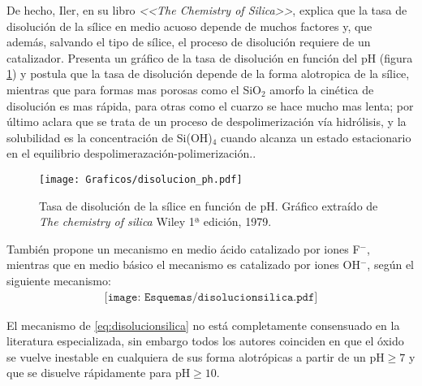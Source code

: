 	De hecho, Iler, en su libro \textit{<<The Chemistry of Silica>>}, explica que la tasa de disolución de la sílice en medio acuoso depende de muchos factores y, que además, salvando el tipo de sílice, el proceso de disolución requiere de un catalizador. Presenta un gráfico de la tasa de disolución en función del pH (figura \ref{fig:disolucion_ph}) y postula que la tasa de disolución depende de la forma alotropica de la sílice, mientras que para formas mas porosas como el SiO$_2$ amorfo la cinética de disolución es mas rápida, para otras como el cuarzo se hace mucho mas lenta; por último aclara que se trata de un proceso de despolimerización vía hidrólisis, y la solubilidad es la concentración de Si(OH)$_4$ cuando alcanza un estado estacionario en el equilibrio despolimerazación-polimerización.\cite{iler1979}. 

			\begin{figure}[th!]
			\centering
 	       	\texttt{[image: Graficos/disolucion\_ph.pdf]}
	       		\caption[Tasa de disolución sílice en función del pH]{Tasa de disolución de la sílice en función de pH. Gráfico extraído de \textit{The chemistry of silica} Wiley 1ª edición, 1979.\cite{iler1979}}
	         	\label{fig:disolucion_ph}
	     		\end{figure}
	
	También propone un mecanismo en medio ácido catalizado por iones F$^-$, mientras que en medio básico el mecanismo es catalizado por iones OH$^-$, según el siguiente mecanismo:
			\begin{equation}
				\begin{aligned}
				\texttt{[image: Esquemas/disolucionsilica.pdf]}
				\label{eq:disolucionsilica}
				\end{aligned}
				\end{equation} 
	
	El mecanismo de \ref{eq:disolucionsilica} no está completamente consensuado en la literatura especializada, sin embargo todos los autores coinciden en que el óxido se vuelve inestable en cualquiera de sus forma alotrópicas a partir de un $\text{pH}\geq7$ y que se disuelve rápidamente para $\text{pH}\geq10$\cite{Kosmulski2002,Kosmulski2014,Schwarz1984,Si-HanWu2013,iler1979}.

